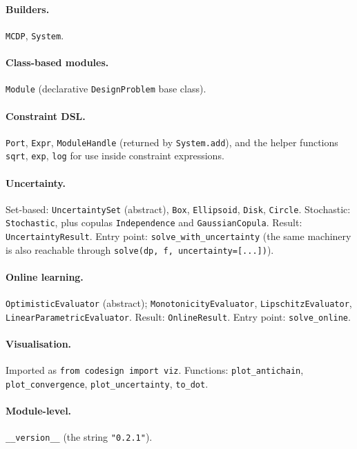 \documentclass[11pt,a4paper]{article}
\begin{document}
\paragraph{Builders.}
\texttt{MCDP}, \texttt{System}.

\paragraph{Class-based modules.}
\texttt{Module} (declarative \texttt{DesignProblem} base class).

\paragraph{Constraint DSL.}
\texttt{Port}, \texttt{Expr}, \texttt{ModuleHandle} (returned by
\texttt{System.add}), and the helper functions \texttt{sqrt},
\texttt{exp}, \texttt{log} for use inside constraint expressions.

\paragraph{Uncertainty.}
Set-based: \texttt{UncertaintySet} (abstract), \texttt{Box},
\texttt{Ellipsoid}, \texttt{Disk}, \texttt{Circle}.
Stochastic: \texttt{Stochastic}, plus copulas
\texttt{Independence} and \texttt{GaussianCopula}.
Result: \texttt{UncertaintyResult}.
Entry point: \texttt{solve\_with\_uncertainty} (the same machinery is
also reachable through \texttt{solve(dp, f, uncertainty=[...])}).

\paragraph{Online learning.}
\texttt{OptimisticEvaluator} (abstract);
\texttt{MonotonicityEvaluator}, \texttt{LipschitzEvaluator},
\texttt{LinearParametricEvaluator}.
Result: \texttt{OnlineResult}.
Entry point: \texttt{solve\_online}.

\paragraph{Visualisation.}
Imported as \texttt{from codesign import viz}. Functions:
\texttt{plot\_antichain}, \texttt{plot\_convergence},
\texttt{plot\_uncertainty}, \texttt{to\_dot}.

\paragraph{Module-level.}
\texttt{\_\_version\_\_} (the string \texttt{"0.2.1"}).
\end{document}
